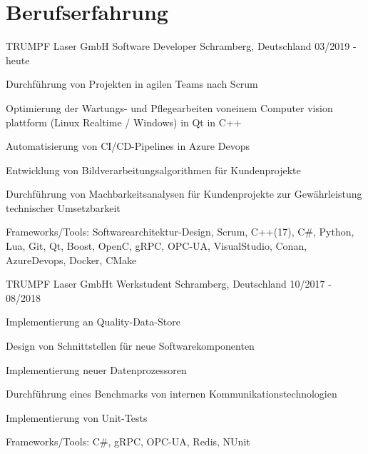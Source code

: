 \section{Berufserfahrung}

\cventry
{TRUMPF Laser GmbH} %
{Software Developer} %
{Schramberg, Deutschland} %
{03/2019 - heute} %
\begin{cvitems}
\item{Durchführung von Projekten in agilen Teams nach Scrum}
\item{Optimierung der Wartungs- und Pflegearbeiten voneinem Computer vision plattform (Linux Realtime / Windows) in Qt in C++}
\item{Automatisierung von CI/CD-Pipelines in Azure Devops}
\item{Entwicklung von Bildverarbeitungsalgorithmen für Kundenprojekte}
\item{Durchführung von Machbarkeitsanalysen für Kundenprojekte zur Gewährleistung technischer Umsetzbarkeit}
\item{Frameworks/Tools: Softwarearchitektur-Design, Scrum,  C++(17), C\#, Python, Lua, Git, Qt, Boost, OpenC, gRPC, OPC-UA, VisualStudio, Conan, AzureDevops, Docker, CMake}
\end{cvitems}

\cventry
{TRUMPF Laser GmbHt} %
{Werkstudent} %
{Schramberg, Deutschland} %
{10/2017 - 08/2018} %
\begin{cvitems}
\item{Implementierung an Quality-Data-Store}
\item{Design von Schnittstellen für neue Softwarekomponenten}
\item{Implementierung neuer Datenprozessoren}
\item{Durchführung eines Benchmarks von  internen Kommunikationstechnologien}
\item{Implementierung von Unit-Tests}
\item{Frameworks/Tools: C\#, gRPC, OPC-UA, Redis, NUnit}
\end{cvitems}
